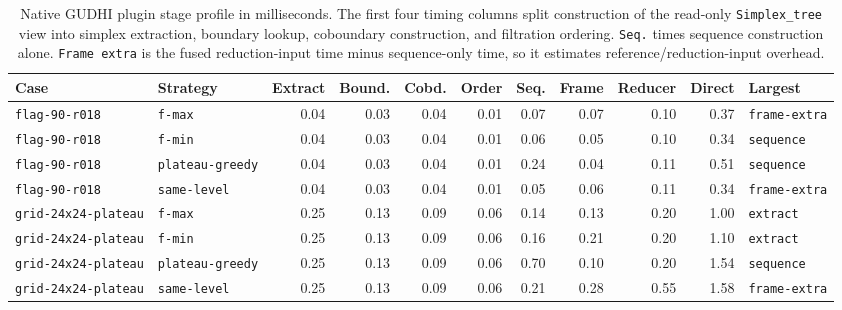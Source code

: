 \begin{table}[ht]
\centering
\scriptsize
\setlength{\tabcolsep}{1.8pt}
\begin{tabular}{llrrrrrrrrl}
\toprule
Case & Strategy & Extract & Bound. & Cobd. & Order & Seq. & Frame & Reducer & Direct & Largest \\
\midrule
\texttt{flag-90-r018} & \texttt{f-max} & 0.04 & 0.03 & 0.04 & 0.01 & 0.07 & 0.07 & 0.10 & 0.37 & \texttt{frame-extra} \\
\texttt{flag-90-r018} & \texttt{f-min} & 0.04 & 0.03 & 0.04 & 0.01 & 0.06 & 0.05 & 0.10 & 0.34 & \texttt{sequence} \\
\texttt{flag-90-r018} & \texttt{plateau-greedy} & 0.04 & 0.03 & 0.04 & 0.01 & 0.24 & 0.04 & 0.11 & 0.51 & \texttt{sequence} \\
\texttt{flag-90-r018} & \texttt{same-level} & 0.04 & 0.03 & 0.04 & 0.01 & 0.05 & 0.06 & 0.11 & 0.34 & \texttt{frame-extra} \\
\midrule
\texttt{grid-24x24-plateau} & \texttt{f-max} & 0.25 & 0.13 & 0.09 & 0.06 & 0.14 & 0.13 & 0.20 & 1.00 & \texttt{extract} \\
\texttt{grid-24x24-plateau} & \texttt{f-min} & 0.25 & 0.13 & 0.09 & 0.06 & 0.16 & 0.21 & 0.20 & 1.10 & \texttt{extract} \\
\texttt{grid-24x24-plateau} & \texttt{plateau-greedy} & 0.25 & 0.13 & 0.09 & 0.06 & 0.70 & 0.10 & 0.20 & 1.54 & \texttt{sequence} \\
\texttt{grid-24x24-plateau} & \texttt{same-level} & 0.25 & 0.13 & 0.09 & 0.06 & 0.21 & 0.28 & 0.55 & 1.58 & \texttt{frame-extra} \\
\bottomrule
\end{tabular}
\caption{Native GUDHI plugin stage profile in milliseconds.  The first four timing columns split construction of the read-only \texttt{Simplex\_tree} view into simplex extraction, boundary lookup, coboundary construction, and filtration ordering.  \texttt{Seq.} times sequence construction alone.  \texttt{Frame extra} is the fused reduction-input time minus sequence-only time, so it estimates reference/reduction-input overhead.}
\label{tab:native-gudhi-stage-profile-quick}
\end{table}
